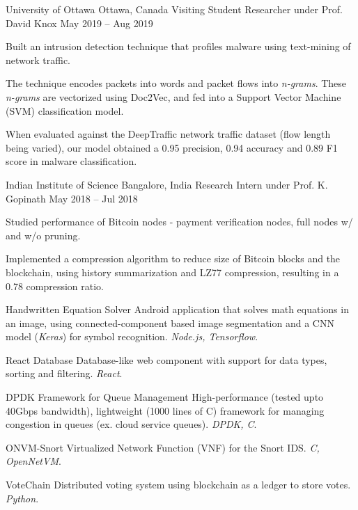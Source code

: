 \documentclass[11pt,a4paper]{article}
\begin{document}
\headedsection
{University of Ottawa}
{Ottawa, Canada}
{Visiting Student Researcher under Prof. David Knox}
{May 2019 -- Aug 2019}{
	\begin{circlist}
		\item Built an intrusion detection technique that profiles malware using text-mining of network traffic.
		\item The technique encodes packets into words and packet flows into \textit{n-grams}. These \textit{n-grams} are vectorized using Doc2Vec, and fed into a Support Vector Machine (SVM) classification model.
		\item When evaluated against the DeepTraffic network traffic dataset (flow length being varied), our model obtained a 0.95 precision, 0.94 accuracy and 0.89 F1 score in malware classification.
	\end{circlist}
}

\headedsection
{Indian Institute of Science}
{Bangalore, India}
{Research Intern under Prof. K. Gopinath}
{May 2018 -- Jul 2018}{
	\begin{circlist}
		\item Studied performance of Bitcoin nodes - payment verification nodes, full nodes w/ and w/o pruning.
		\item Implemented a compression algorithm to reduce size of Bitcoin blocks and the blockchain, using history summarization and LZ77 compression, resulting in a 0.78 compression ratio.
	\end{circlist}
}


\headedsectiontwo
{Handwritten Equation Solver}{}{}
{
	Android application that solves math equations in an image, using connected-component based image segmentation and a CNN model (\textit{Keras}) for symbol recognition. \textit{Node.js, Tensorflow}.
}

\headedsectiontwo
{React Database}{}{}
{
	Database-like web component with support for data types, sorting and filtering. \textit{React}.
}

\headedsectiontwo
{DPDK Framework for Queue Management}{}{}
{
	High-performance (tested upto 40Gbps bandwidth), lightweight (1000 lines of C) framework for managing congestion in queues (ex. cloud service queues). \textit{DPDK, C}.
}

\headedsectiontwo
{ONVM-Snort}{}{}
{
	Virtualized Network Function (VNF) for the Snort IDS. \textit{C, OpenNetVM}.
}

\headedsectiontwo
{VoteChain}{}{}
{
	Distributed voting system using blockchain as a ledger to store votes. \textit{Python}.
}
\end{document}

